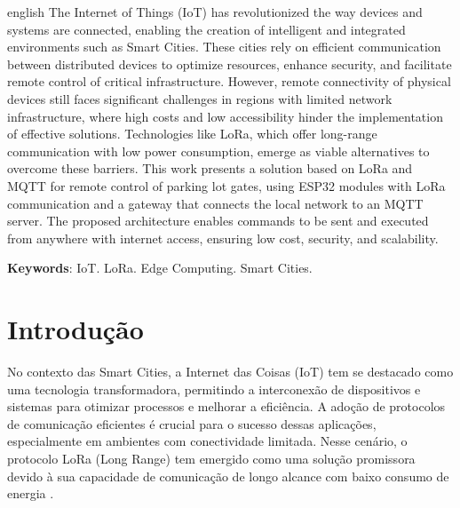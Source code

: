 \documentclass[
article,			%
11pt,				%
twoside,			%
a4paper,			%
section=TITLE,		%
onecolumn,          %
english,			%
brazil,				%
sumario=tradicional
]{abntex2}
\begin{document}
\renewcommand{\resumoname}{Abstract}
\begin{resumo}
    \begin{otherlanguage*}{english}
        The Internet of Things (IoT) has revolutionized the way devices and systems are connected, enabling the creation of intelligent and integrated environments such as Smart Cities. These cities rely on efficient communication between distributed devices to optimize resources, enhance security, and facilitate remote control of critical infrastructure. However, remote connectivity of physical devices still faces significant challenges in regions with limited network infrastructure, where high costs and low accessibility hinder the implementation of effective solutions. Technologies like LoRa, which offer long-range communication with low power consumption, emerge as viable alternatives to overcome these barriers. This work presents a solution based on LoRa and MQTT for remote control of parking lot gates, using ESP32 modules with LoRa communication and a gateway that connects the local network to an MQTT server. The proposed architecture enables commands to be sent and executed from anywhere with internet access, ensuring low cost, security, and scalability.
        
        \noindent
        \textbf{Keywords}: IoT. LoRa. Edge Computing. Smart Cities.
    \end{otherlanguage*}  
\end{resumo}


\vspace{\onelineskip}%

\textual

\section{Introdução}

    No contexto das Smart Cities, a Internet das Coisas (IoT) tem se destacado como uma tecnologia transformadora, permitindo a interconexão de dispositivos e sistemas para otimizar processos e melhorar a eficiência. A adoção de protocolos de comunicação eficientes é crucial para o sucesso dessas aplicações, especialmente em ambientes com conectividade limitada. Nesse cenário, o protocolo LoRa (Long Range) tem emergido como uma solução promissora devido à sua capacidade de comunicação de longo alcance com baixo consumo de energia \cite{Yoon2020}.
\end{document}
